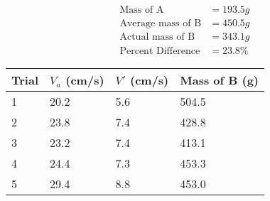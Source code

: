 \begin{equation*}
    \begin{aligned}
        \text{Mass of A}&=193.5g \\
        \text{Average mass of B}&=450.5g \\
        \text{Actual mass of B}&=343.1g \\
        \text{Percent Difference}&=23.8\%
    \end{aligned}
\end{equation*}
\begin{table}[H]
    \begin{tabular}{|l|l|l|l|}
    \hline
    Trial & $V_a$ (cm/s) & $V'$ (cm/s) & Mass of B (g) \\ \hline
    1     & 20.2        & 5.6       & 504.5         \\ \hline
    2     & 23.8        & 7.4       & 428.8         \\ \hline
    3     & 23.2        & 7.4       & 413.1         \\ \hline
    4     & 24.4        & 7.3       & 453.3         \\ \hline
    5     & 29.4        & 8.8       & 453.0         \\ \hline
    \end{tabular}
    \end{table}
    